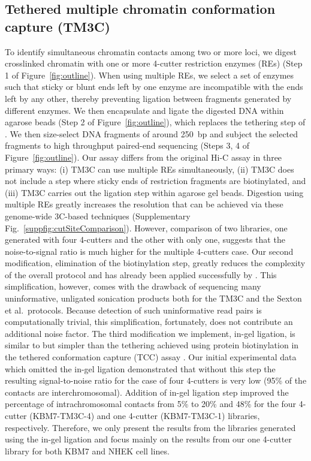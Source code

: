 \subsection{Tethered multiple chromatin conformation capture (TM3C)}
To identify simultaneous chromatin contacts among two or more loci,
we digest crosslinked chromatin with one or more 4-cutter restriction
enzymes (REs) (Step 1 of Figure~\ref{fig:outline}). When using multiple
REs, we select a set of enzymes such that sticky or blunt ends left by one
enzyme are incompatible with the ends left by any other, thereby preventing
ligation between fragments generated by different enzymes. We then encapsulate
and ligate the digested DNA within agarose beads
(Step 2 of Figure~\ref{fig:outline}), which replaces the tethering step of
\citet{kalhor:genome}. We then size-select DNA fragments of around 250~bp
and subject the selected fragments to high throughput paired-end sequencing
(Steps 3, 4 of Figure~\ref{fig:outline}). Our assay differs from the original
Hi-C assay in three primary ways: (i) TM3C can use multiple REs simultaneously,
(ii) TM3C does not include a step where sticky ends of restriction fragments
are biotinylated, and (iii) TM3C carries out the ligation step within agarose
gel beads. Digestion using multiple REs greatly increases the resolution that
can be achieved via these genome-wide 3C-based techniques
(Supplementary Fig.~\ref{suppfig:cutSiteComparison}). However, comparison of
two libraries, one generated with four 4-cutters and the other with only one,
suggests that the noise-to-signal ratio is much higher for the multiple 4-cutters case.
Our second modification, elimination of the biotinylation step, greatly reduces
the complexity of the overall protocol and has already been applied successfully by
\citet{sexton:three-dimensional}. This simplification, however,
comes with the drawback of sequencing many uninformative, unligated sonication
products both for the TM3C and the Sexton et al.\ protocols. Because detection of
such uninformative read pairs is computationally trivial, this simplification,
fortunately, does not contribute an additional noise factor. The third
modification we implement, in-gel ligation, is similar to but simpler
than the tethering achieved
using protein biotinylation in the tethered conformation capture (TCC)
assay \citep{kalhor:genome}. Our initial experimental data which omitted
the in-gel ligation demonstrated that without this step the resulting
signal-to-noise ratio for the case of four 4-cutters is very low
(95\% of the contacts are interchromosomal). Addition of in-gel ligation step
improved the percentage of intrachromosomal contacts from 5\% to 20\% and
48\% for the four 4-cutter (KBM7-TM3C-4) and one 4-cutter (KBM7-TM3C-1)
libraries, respectively. Therefore, we only present the results from the
libraries generated using the in-gel ligation and focus mainly on the
results from our one 4-cutter library for both KBM7 and NHEK cell lines.


